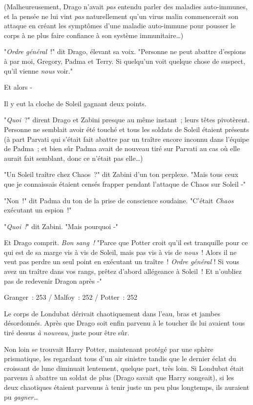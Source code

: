 (Malheureusement, Drago n'avait \emph{pas} entendu parler des maladies auto-immunes, et la pensée ne lui vint \emph{pas} naturellement qu'un virus malin commencerait son attaque en créant les symptômes d'une maladie auto-immune pour pousser le corps à ne plus faire confiance à son système immunitaire…)

"\emph{Ordre général}~!" dit Drago, élevant sa voix. "Personne ne peut abattre d'espions à par moi, Gregory, Padma et Terry. Si quelqu'un voit quelque chose de suspect, qu'il vienne \emph{nous} voir."

Et alors -

Il y eut la cloche de Soleil gagnant deux points.

"\emph{Quoi}~?" dirent Drago et Zabini presque au même instant~; leurs têtes pivotèrent. Personne ne semblait avoir été touché et tous les soldats de Soleil étaient présents (à part Parvati qui s'était fait abattre par un traître encore inconnu dans l'équipe de Padma~; et bien sûr Padma avait de nouveau tiré sur Parvati au cas où elle aurait fait semblant, donc ce n'était pas elle…)

"Un Soleil traître chez Chaos~?" dit Zabini d'un ton perplexe. "Mais tous ceux que je connaissais étaient censés frapper pendant l'attaque de Chaos sur Soleil -"

"Non~!" dit Padma du ton de la prise de conscience soudaine. "C'était \emph{Chaos} exécutant un espion~!"

"\emph{Quoi~!}" dit Zabini. "Mais pourquoi -"

Et Drago comprit. \emph{Bon sang~!} "Parce que Potter croit qu'il est tranquille pour ce qui est de sa marge vis à vis de Soleil, mais pas vis à vis de \emph{nous}~! Alors il ne veut pas perdre un seul point en exécutant un traître~! \emph{Ordre général} ! Si vous avez un traître dans vos rangs, prêtez d'abord allégeance à Soleil~! Et n'oubliez pas de redevenir Dragon après -"

\later

Granger~: 253 / Malfoy~: 252 / Potter~: 252

Le corps de Londubat dérivait chaotiquement dans l'eau, bras et jambes désordonnés. Après que Drago soit enfin parvenu à le toucher ils lui avaient tous tiré dessus \emph{à nouveau}, juste pour être sûr.

Non loin se trouvait Harry Potter, maintenant protégé par une sphère prismatique, les regardant tous d'un air sinistre tandis que le dernier éclat du croissant de lune diminuait lentement, quelque part, très loin. Si Londubat était parvenu à abattre un soldat de plus (Drago savait que Harry songeait), si les deux chaotiques étaient parvenus à tenir juste un peu plus longtemps, ils auraient pu \emph{gagner}…

